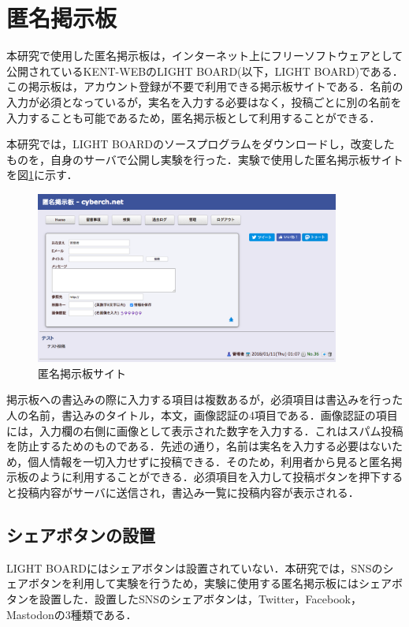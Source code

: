 \documentclass[10pt, a4paper]{jreport}
\begin{document}
\section{匿名掲示板}\label{sec: bbs}
本研究で使用した匿名掲示板は，インターネット上にフリーソフトウェアとして公開されているKENT-WEBのLIGHT BOARD(以下，LIGHT BOARD)である\cite{kent_web_bbs}．この掲示板は，アカウント登録が不要で利用できる掲示板サイトである．名前の入力が必須となっているが，実名を入力する必要はなく，投稿ごとに別の名前を入力することも可能であるため，匿名掲示板として利用することができる．

本研究では，LIGHT BOARDのソースプログラムをダウンロードし，改変したものを，自身のサーバで公開し実験を行った．実験で使用した匿名掲示板サイトを図\ref{fig: bbs_screenshot}に示す．

\begin{figure}[H]
	\begin{center}
		\includegraphics[width=100mm]{figures/bbs_screenshot.png}
	\end{center}
	\caption{匿名掲示板サイト}
	\label{fig: bbs_screenshot}
\end{figure}

掲示板への書込みの際に入力する項目は複数あるが，必須項目は書込みを行った人の名前，書込みのタイトル，本文，画像認証の4項目である．画像認証の項目には，入力欄の右側に画像として表示された数字を入力する．これはスパム投稿を防止するためのものである．先述の通り，名前は実名を入力する必要はないため，個人情報を一切入力せずに投稿できる．そのため，利用者から見ると匿名掲示板のように利用することができる．必須項目を入力して投稿ボタンを押下すると投稿内容がサーバに送信され，書込み一覧に投稿内容が表示される．

\subsection{シェアボタンの設置}
LIGHT BOARDにはシェアボタンは設置されていない．本研究では，SNSのシェアボタンを利用して実験を行うため，実験に使用する匿名掲示板にはシェアボタンを設置した．設置したSNSのシェアボタンは，Twitter，Facebook，Mastodonの3種類である．
\end{document}
